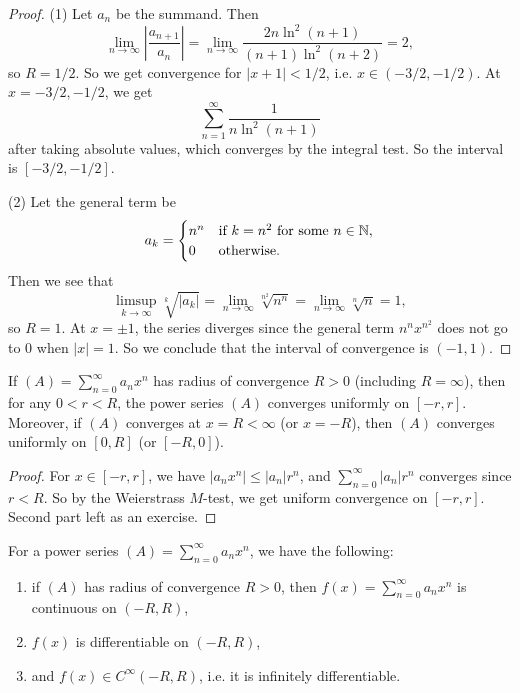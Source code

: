 \begin{proof}
  (1) Let $a_n$ be the summand. Then
  \[
    \lim_{n \to \infty} \left|\frac{a_{n + 1}}{a_n}\right|
    = \lim_{n \to \infty} \frac{2n \ln^2(n + 1)}{(n + 1)\ln^2(n + 2)}
    = 2,
  \]
  so $R = 1 / 2$. So we get convergence for
  $|x + 1| < 1 / 2$, i.e. $x \in (-3 / 2, -1 / 2)$.
  At $x = -3 / 2, -1 / 2$, we get
  \[
    \sum_{n = 1}^\infty \frac{1}{n \ln^2(n + 1)}
  \]
  after taking absolute values, which converges by
  the integral test. So the interval
  is $[-3 / 2, -1 / 2]$.

  (2) Let the general term be
  \[
    a_k =
    \begin{cases}
      n^n & \text{if $k = n^2$ for some $n \in \mathbb{N}$},\\
      0 & \text{otherwise}.
    \end{cases}
  \]
  Then we see that
  \[
    \limsup_{k \to \infty} \sqrt[k]{|a_k|}
    = \lim_{n \to \infty} \sqrt[n^2]{n^n}
    = \lim_{n \to \infty} \sqrt[n]{n} = 1,
  \]
  so $R = 1$. At $x = \pm 1$, the series diverges since
  the general term
  $n^n x^{n^2}$ does not go to $0$ when $|x| = 1$. So
  we conclude that the interval of convergence is
  $(-1, 1)$.
\end{proof}

\begin{theorem}
  If $(A) = \sum_{n = 0}^\infty a_n x^n$ has radius of
  convergence $R > 0$ (including $R = \infty$), then
  for any $0 < r < R$, the power series $(A)$ converges
  uniformly on $[-r, r]$. Moreover, if $(A)$ converges
  at $x = R < \infty$ (or $x = -R$), then $(A)$
  converges uniformly on $[0, R]$ (or $[-R, 0]$).
\end{theorem}

\begin{proof}
  For $x \in [-r, r]$, we have $|a_n x^n| \le |a_n| r^n$,
  and $\sum_{n = 0}^\infty |a_n| r^n$ converges since
  $r < R$. So by the Weierstrass $M$-test, we get
  uniform convergence on $[-r, r]$. Second part left
  as an exercise.
\end{proof}

\begin{corollary}
  For a power series $(A) = \sum_{n = 0}^\infty a_n x^n$,
  we have the following:
  \begin{enumerate}
    \item if $(A)$ has
      radius of convergence $R > 0$, then
      $f(x) = \sum_{n = 0}^\infty a_n x^n$ is continuous
      on $(-R, R)$,
    \item $f(x)$ is differentiable on $(-R, R)$,
    \item and $f(x) \in C^\infty(-R, R)$, i.e. it is
      infinitely differentiable.
  \end{enumerate}
\end{corollary}

